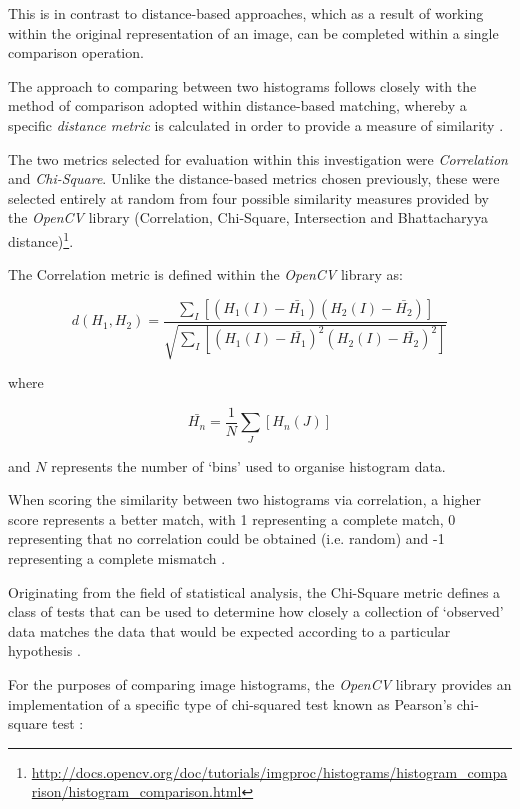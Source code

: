This is in contrast to distance-based approaches, which as a result of working within the original representation of an image, can be completed within a single comparison operation. 

The approach to comparing between two histograms follows closely with the method of comparison adopted within distance-based matching, whereby a specific \textit{distance metric} is calculated in order to provide a measure of similarity \cite{bradski2008learning}. 

The two metrics selected for evaluation within this investigation were \textit{Correlation} and \textit{Chi-Square}. Unlike the distance-based metrics chosen previously, these were selected entirely at random from four possible similarity measures provided by the \textit{OpenCV} library (Correlation, Chi-Square, Intersection and Bhattacharyya distance)\footnote{\url{http://docs.opencv.org/doc/tutorials/imgproc/histograms/histogram_comparison/histogram_comparison.html}}.

The Correlation metric is defined within the \textit{OpenCV} library \cite{opencvhistogram} as:

\begin{equation}
d(H_{1}, H_{2}) = \frac{\sum\nolimits_{I}[(H_{1}(I) - \bar{H_{1}})(H_{2}(I) - \bar{H_{2}})]}{\sqrt{\sum\nolimits_{I}[(H_{1}(I) - \bar{H_{1}})^2(H_{2}(I) - \bar{H_{2}})^2]}}
\end{equation}

where

\begin{equation}
\bar{H_{n}} = \frac{1}{N}\sum\limits_{J}[H_{n}(J)]
\end{equation}

and $N$ represents the number of `bins' used to organise histogram data. 

When scoring the similarity between two histograms via correlation, a higher score represents a better match, with 1 representing a complete match, 0 representing that no correlation could be obtained (i.e. random) and -1 representing a complete mismatch \cite{bradski2008learning}.

Originating from the field of statistical analysis, the Chi-Square metric defines a class of tests that can be used to determine how closely a collection of `observed' data matches the data that would be expected according to a particular hypothesis \cite{mclaughlin}. 

For the purposes of comparing image histograms, the \textit{OpenCV} library provides an implementation of a specific type of chi-squared test known as Pearson's chi-square test \cite{bradski2008learning}:

